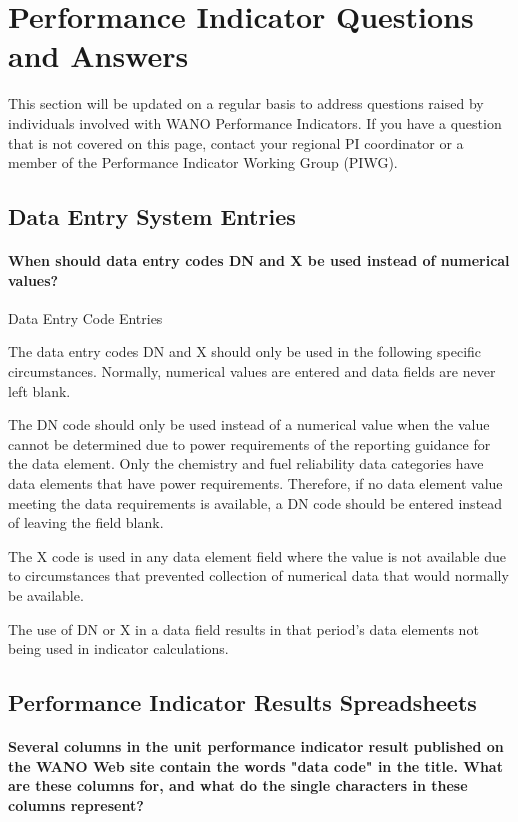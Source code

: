
\section{Performance Indicator Questions and Answers}

This section will be updated on a regular basis to address questions raised by individuals involved with WANO Performance Indicators. If you have a question that is not covered on this page, contact your regional PI coordinator or a member of the Performance Indicator Working Group (PIWG).

\subsection{Data Entry System Entries}

\paragraph{When should data entry codes DN and X be used instead of numerical values?}

Data Entry Code Entries

    The data entry codes DN and X should only be used in the following specific circumstances. Normally, numerical values are entered and data fields are never left blank.

    The DN code should only be used instead of a numerical value when the value cannot be determined due to power requirements of the reporting guidance for the data element. Only the chemistry and fuel reliability data categories have data elements that have power requirements. Therefore, if no data element value meeting the data requirements is available, a DN code should be entered instead of leaving the field blank.

    The X code is used in any data element field where the value is not available due to circumstances that prevented collection of numerical data that would normally be available.

    The use of DN or X in a data field results in that period's data elements not being used in indicator calculations.

\subsection{Performance Indicator Results Spreadsheets}

\paragraph{Several columns in the unit performance indicator result
    published on the WANO Web site contain the words "data code" in
    the title. What are these columns for, and what do the single
    characters in these columns represent?}

